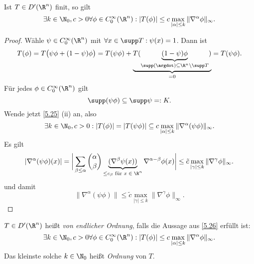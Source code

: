 \begin{kor} \label{5.26}
	Ist $T \in D'(\R^n)$ finit, so gilt
	\[
		\exists k \in \N_0, c > 0 \forall \phi \in C_0^\infty(\R^n):
		|T(\phi)| \le c \max_{|\alpha| \le k} \|\nabla^\alpha \phi \|_\infty.
	\]
	\begin{proof}
		Wähle $\psi \in C_0^\infty(\R^n)$ mit $\forall x \in \supp T : \psi(x) = 1$.
		Dann ist
		\[
			T(\phi)
			= T\big(\psi \phi + (1-\psi) \phi\big)
			= T(\psi \phi) + \underbrace{T(\underbrace{(1-\psi) \phi}_{\supp (\argdot) \subset \R^n \setminus \supp T})}_{=0}
			= T(\psi \phi).
		\]
		Für jedes $\phi \in C_0^\infty(\R^n)$ gilt
		\[
			\supp(\psi \phi)
			\subset \supp \psi
			=: K.
		\]
		Wende jetzt \ref{5.25} (ii) an, also
		\[
			\exists k \in \N_0, c > 0 :
			|T(\phi)| = |T(\psi\phi)| \subset c \max_{|\alpha| \le k} \| \nabla^\alpha (\psi\phi) \|_\infty.
		\]
		Es gilt
		\begin{align*}
			|\nabla^\alpha (\psi\phi)(x)|
			= \bigg| \sum_{\beta \le \alpha} \binom{\alpha}{\beta} \underbrace{(\nabla^\beta \psi(x))}_{\le c_\beta \text{ für $x\in \R^n$}} \nabla^{\alpha - \beta} \phi(x) \bigg|
			\le \tilde c \max_{|\gamma|\le k} \|\nabla^\gamma \phi\|_\infty.
		\end{align*}
		und damit
		\[
			\|\nabla^\alpha (\psi \phi)\|
			\le \tilde c \max_{|\gamma| \le k} \|\nabla^\gamma \phi \|_\infty.
		\]
	\end{proof}
\end{kor}

\begin{df} \label{5.27}
	$T \in D'(\R^n)$ heißt \emph{von endlicher Ordnung}, falls die Aussage aus \ref{5.26} erfüllt ist:
	\[
		\exists k \in \N_0, c > 0 \forall \phi \in C_0^\infty(\R^n):
		|T(\phi)| \le c \max_{|\alpha| \le k} \|\nabla^\alpha \phi \|_\infty.
	\]
	Das kleinste solche $k \in \N_0$ heißt \emph{Ordnung} von $T$.
\end{df}


